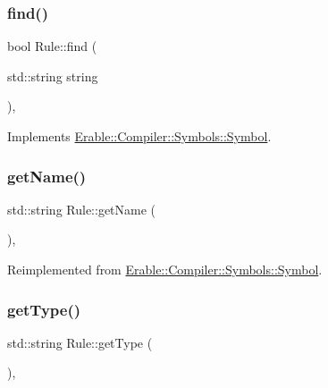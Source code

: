\subsubsection{\texorpdfstring{find()}{find()}}
{\footnotesize\ttfamily bool Rule\+::find (\begin{DoxyParamCaption}\item[{std\+::string}]{string }\end{DoxyParamCaption})\hspace{0.3cm}{\ttfamily [override]}, {\ttfamily [virtual]}}



Implements \mbox{\hyperlink{class_erable_1_1_compiler_1_1_symbols_1_1_symbol_ac1d8b1392aef2e93bd47520a86f8617f}{Erable\+::\+Compiler\+::\+Symbols\+::\+Symbol}}.

\mbox{\label{class_erable_1_1_compiler_1_1_symbols_1_1_rule_a6e71596b90545fe69d089a3e706e4303}} 
\subsubsection{\texorpdfstring{getName()}{getName()}}
{\footnotesize\ttfamily std\+::string Rule\+::get\+Name (\begin{DoxyParamCaption}{ }\end{DoxyParamCaption})\hspace{0.3cm}{\ttfamily [override]}, {\ttfamily [virtual]}}



Reimplemented from \mbox{\hyperlink{class_erable_1_1_compiler_1_1_symbols_1_1_symbol_a71aeae736d2ec43f0880341d53bbcc2c}{Erable\+::\+Compiler\+::\+Symbols\+::\+Symbol}}.

\mbox{\label{class_erable_1_1_compiler_1_1_symbols_1_1_rule_a6e0b51b5ecaed4785480d534dc09cb8e}} 
\subsubsection{\texorpdfstring{getType()}{getType()}}
{\footnotesize\ttfamily std\+::string Rule\+::get\+Type (\begin{DoxyParamCaption}{ }\end{DoxyParamCaption})\hspace{0.3cm}{\ttfamily [override]}, {\ttfamily [virtual]}}



